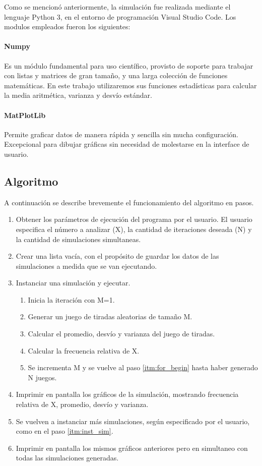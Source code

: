 \documentclass{article}
\begin{document}
Como se mencionó anteriormente, la simulación fue realizada mediante el lenguaje Python 3, en el entorno de programación Visual Studio Code. Los modulos empleados fueron los siguientes:

\paragraph{Numpy} Es un módulo fundamental para uso científico, provisto de soporte para trabajar con listas y matrices de gran tamaño, y una larga colección de funciones matemáticas. En este trabajo utilizaremos sus funciones estadísticas para calcular la media aritmética, varianza y desvío estándar.

\paragraph{MatPlotLib} Permite graficar datos de manera rápida y sencilla sin mucha configuración. Excepcional para dibujar gráficas sin necesidad de molestarse en la interface de usuario.

\subsection{Algoritmo}

A continuación se describe brevemente el funcionamiento del algoritmo en pasos.

\begin{enumerate}
\item Obtener los parámetros de ejecución del programa por el usuario. El usuario especifica el número a analizar (X), la cantidad de iteraciones deseada (N) y la cantidad de simulaciones simultaneas.
\item Crear una lista vacía, con el propósito de guardar los datos de las simulaciones a medida que se van ejecutando.
\item \label{itm:inst_sim} Instanciar una simulación y ejecutar.
\begin{enumerate}
\item Inicia la iteración con M=1.
\item \label{itm:for_begin} Generar un juego de tiradas aleatorias de tamaño M.
\item Calcular el promedio, desvío y varianza del juego de tiradas.
\item Calcular la frecuencia relativa de X.
\item Se incrementa M y se vuelve al paso \ref{itm:for_begin} hasta haber generado N juegos.
\end{enumerate}
\item Imprimir en pantalla los gráficos de la simulación, mostrando frecuencia relativa de X, promedio, desvío y varianza.
\item Se vuelven a instanciar más simulaciones, según especificado por el usuario, como en el paso \ref{itm:inst_sim}.
\item Imprimir en pantalla los mismos gráficos anteriores pero en simultaneo con todas las simulaciones generadas.

\end{enumerate}
\end{document}
